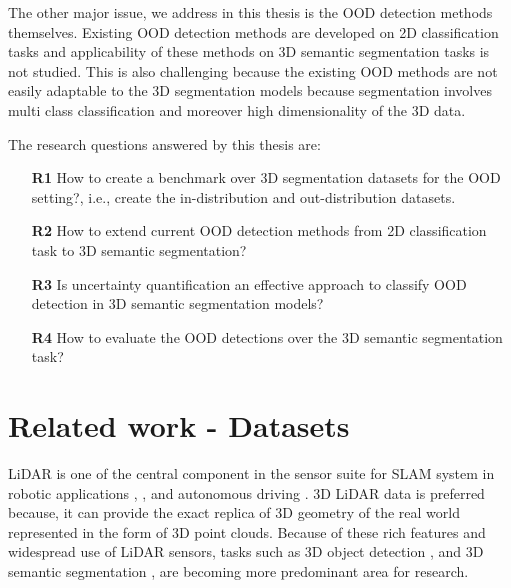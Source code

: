 The other major issue, we address in this thesis is the OOD detection methods themselves.
Existing OOD detection methods are developed on 2D classification tasks and applicability of these methods on 3D semantic segmentation tasks is not studied. 
This is also challenging because the existing OOD methods are not easily adaptable to the 3D segmentation models because segmentation involves multi class classification and moreover high dimensionality of the 3D data.
\newline

The research questions answered by this thesis are:
\begin{itemize}
    \item[\textbf{R1}] How to create a benchmark over 3D segmentation datasets for the OOD setting?, i.e., create the in-distribution and out-distribution datasets.
    \item[\textbf{R2}] How to extend current OOD detection methods from 2D classification task to 3D semantic segmentation?
    \item[\textbf{R3}] Is uncertainty quantification an effective approach to classify OOD detection in 3D semantic segmentation models?
    \item[\textbf{R4}] How to evaluate the OOD detections over the 3D semantic segmentation task?
\end{itemize}
\section{Related work - Datasets}
LiDAR is one of the central component in the sensor suite for SLAM system in robotic applications \cite{thrun2006stanley}, \cite{patz2008practical}, \cite{hess20162dSLAM} and autonomous driving \cite{li2016vehicle}.
3D LiDAR data is preferred because, it can provide the exact replica of 3D geometry of the real world represented in the form of 3D point clouds.
Because of these rich features and widespread use of LiDAR sensors, tasks such as 3D object detection \cite{zhou2018voxelnet}, \cite{PIXOR} and 3D semantic segmentation \cite{qi2017pointnet++}, \cite{3Dmininet} are becoming more predominant area for research.

